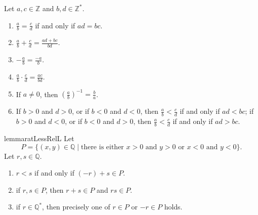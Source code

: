 \begin{lemma} %
	\label{rat:l:alt_def}
	Let $a, c \in \mathbb{Z}$ and $b, d \in \mathbb{Z}^{*}$.
	\begin{enumerate}
		\item \label{rat:l:alt_def:1}
		      $\frac{a}{b} = \frac{c}{d}$ if and only if $a d = b c$.
		\item \label{rat:l:alt_def:2}
		      $\frac{a}{b} + \frac{c}{d} = \frac{a d + b c}{b d}$.
		\item \label{rat:l:alt_def:3}
		      $-\frac{a}{b} = \frac{-a}{b}$.
		\item \label{rat:l:alt_def:4}
		      $\frac{a}{b} \cdot \frac{c}{d} = \frac{a c}{b d}$.
		\item \label{rat:l:alt_def:5}
		      If $a \neq 0$, then $\left( \frac{a}{b} \right)^{-1} = \frac{b}{a}$.
		\item \label{rat:l:alt_def:6}
		      If $b > 0$ and $d > 0$, or if $b < 0$ and $d < 0$, then $\frac{a}{b} < \frac{c}{d}$ if and only if $a d < b c$; if $b > 0$ and $d < 0$, or if $b < 0$ and $d > 0$, then $\frac{a}{b} < \frac{c}{d}$ if and only if $a d > b c$.
	\end{enumerate}
\end{lemma}


\Newpage
\begin{restatable}{lemma}{ratLessRelL} %
	\label{rat:l:less_relation}
	Let
	$$
		P = \{ (x, y) \in \mathbb{Q} \mid \text{there is either $x > 0$ and $y > 0$ or $x < 0$ and $y < 0$} \}.
	$$
	Let $r, s \in \mathbb{Q}$.
	\begin{enumerate}
		\item \label{rat:l:less_relation:1}
		      $r < s$ if and only if $(-r) + s \in P$.
		\item \label{rat:l:less_relation:2}
		      if $r, s \in P$, then $r + s \in P$ and $r s \in P$.
		\item \label{rat:l:less_relation:3}
		      if $r \in \mathbb{Q}^{*}$, then precisely one of $r \in P$ or $-r \in P$ holds.
	\end{enumerate}
\end{restatable}

